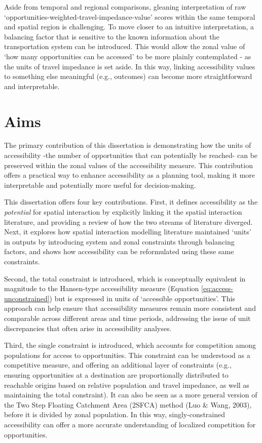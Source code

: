 \documentclass[
11pt, %
oneside, %
english, %
singlespacing, %
]{macthesis} %
\begin{document}
Aside from temporal and regional comparisons, gleaning interpretation of raw `opportunities-weighted-travel-impedance-value' scores within the same temporal and spatial region is challenging. To move closer to an intuitive interpretation, a balancing factor that is sensitive to the known information about the transportation system can be introduced. This would allow the zonal value of `how many opportunities can be accessed' to be more plainly contemplated - as the units of travel impedance is set aside. In this way, linking accessibility values to something else meaningful (e.g., outcomes) can become more straightforward and interpretable.

\section{Aims}\label{aims}

The primary contribution of this dissertation is demonstrating how the units of accessibility -the number of opportunities that can potentially be reached- can be preserved within the zonal values of the accessibility measure. This contribution offers a practical way to enhance accessibility as a planning tool, making it more interpretable and potentially more useful for decision-making.

This dissertation offers four key contributions. First, it defines accessibility as the \emph{potential} for spatial interaction by explicitly linking it the spatial interaction literature, and providing a review of how the two streams of literature diverged. Next, it explores how spatial interaction modelling literature maintained `units' in outputs by introducing system and zonal constraints through balancing factors, and shows how accessibility can be reformulated using these same constraints.

Second, the total constraint is introduced, which is conceptually equivalent in magnitude to the Hansen-type accessibility measure (Equation \ref{eq:access-unconstrained}) but is expressed in units of `accessible opportunities'. This approach can help ensure that accessibility measures remain more consistent and comparable across different areas and time periods, addressing the issue of unit discrepancies that often arise in accessibility analyses.

Third, the single constraint is introduced, which accounts for competition among populations for access to opportunities. This constraint can be understood as a competitive measure, and offering an additional layer of constraints (e.g., ensuring opportunities at a destination are proportionally distributed to reachable origins based on relative population and travel impedance, as well as maintaining the total constraint). It can also be seen as a more general version of the Two Step Floating Catchment Area (2SFCA) method (Luo \& Wang, 2003), before it is divided by zonal population. In this way, singly-constrained accessibility can offer a more accurate understanding of localized competition for opportunities.
\end{document}
